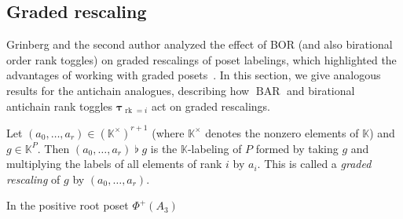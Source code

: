 \documentclass[ALCO,ThmDefs,Unicode,epreuves]{cedram}
\newcommand{\defn}[1]{\emph{#1}}
\newcommand{\kk}{\mathbb{K}}
\DeclareMathOperator{\rk}{rk}
\DeclareMathOperator{\BAR}{BAR}
\newcommand{\rktau}[1]{\boldsymbol{\tau}_{\rk=#1}}
\newcommand{\flatbin}{\mathbin{\flat}}
\begin{document}
\subsection{Graded rescaling}\label{ss:g-rescaling}

Grinberg and the second author analyzed the effect of BOR (and also birational order rank
toggles) on graded rescalings of poset labelings, which highlighted the advantages of working with
graded posets~\cite{GrRo16}. In this section, we give analogous results for the antichain
analogues, describing how $\BAR$ and birational antichain rank toggles $\rktau{i}$ act on
graded rescalings.

\begin{defi}\label{defn:graded_resc}
Let $(a_0,\dots,a_r)\in(\kk^\times)^{r+1}$ (where $\kk^{\times}$ denotes the nonzero elements of
$\kk$) and
$g\in\kk^P$.
Then $(a_0,\dots,a_r)\flatbin g$ is the $\kk$-labeling of $P$
formed by taking $g$ and multiplying the labels of all elements of rank $i$
by $a_i$. This is called a \defn{graded rescaling} of $g$ by $(a_0,\dots,a_r)$.
\end{defi}

\begin{exam}In the positive root poset $\Phi^+(A_3)$

\begin{center}
\end{center}
\end{exam}
\end{document}
